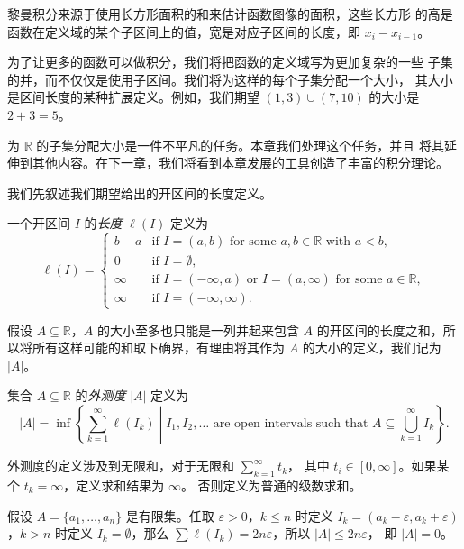 \documentclass[fontset=none]{Notes}
\begin{document}
黎曼积分来源于使用长方形面积的和来估计函数图像的面积，这些长方形
的高是函数在定义域的某个子区间上的值，宽是对应子区间的长度，即
$x_i-x_{i-1}$。

为了让更多的函数可以做积分，我们将把函数的定义域写为更加复杂的一些
子集的并，而不仅仅是使用子区间。我们将为这样的每个子集分配一个大小，
其大小是区间长度的某种扩展定义。例如，我们期望
$(1,3)\cup(7,10)$ 的大小是 $2+3=5$。

为 $\mathbb{R}$ 的子集分配大小是一件不平凡的任务。本章我们处理这个任务，并且
将其延伸到其他内容。在下一章，我们将看到本章发展的工具创造了丰富的积分理论。

我们先叙述我们期望给出的开区间的长度定义。

\begin{definition}
  一个开区间 $I$ 的\emph{长度} $\ell(I)$ 定义为
  \[
    \ell(I)=\begin{cases}
      b-a & \text{if $I=(a,b)$ for some $a,b\in \mathbb{R}$ with $a<b$},\\
      0 & \text{if $I=\emptyset$},\\
      \infty & \text{if $I=(-\infty,a)$ or $I=(a,\infty)$ for some $a\in \mathbb{R}$},\\
      \infty & \text{if $I=(-\infty,\infty)$}.
    \end{cases}
  \]
\end{definition}

假设 $A\subseteq \mathbb{R}$，$A$ 的大小至多也只能是一列并起来包含 $A$
的开区间的长度之和，所以将所有这样可能的和取下确界，有理由将其作为 $A$
的大小的定义，我们记为 $|A|$。

\begin{definition}
  集合 $A\subseteq \mathbb{R}$ 的\emph{外测度} $|A|$ 定义为
  \[
    |A|=\inf\left\{\sum_{k=1}^\infty\ell(I_k) \middle| \text{$I_1,I_2,\dots$ are open intervals such that $A\subseteq\bigcup_{k=1}^\infty I_k$}\right\}.
  \]
\end{definition}

外测度的定义涉及到无限和，对于无限和 $\sum_{k=1}^\infty t_k$，
其中 $t_i\in[0,\infty]$。如果某个 $t_k=\infty$，定义求和结果为 $\infty$。
否则定义为普通的级数求和。

\begin{example}[有限集的外测度为零]
  假设 $A=\{a_1,\dots,a_n\}$ 是有限集。任取 $\varepsilon>0$，$k\leq n$ 时定义
  $I_k=(a_k-\varepsilon,a_k+\varepsilon)$，$k>n$ 时定义 $I_k=\emptyset$，那么
  $\sum \ell(I_k)=2n\varepsilon$，所以 $|A|\leq 2n\varepsilon$，
  即 $|A|=0$。
\end{example}
\end{document}
